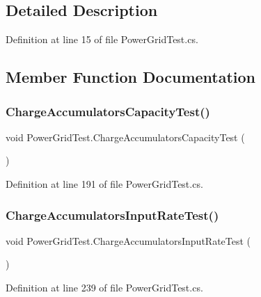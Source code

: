 \subsection{Detailed Description}


Definition at line 15 of file Power\+Grid\+Test.\+cs.



\subsection{Member Function Documentation}
\mbox{\label{class_power_grid_test_a5664e36caefc2c71c830df6188c187e0}} 
\subsubsection{\texorpdfstring{Charge\+Accumulators\+Capacity\+Test()}{ChargeAccumulatorsCapacityTest()}}
{\footnotesize\ttfamily void Power\+Grid\+Test.\+Charge\+Accumulators\+Capacity\+Test (\begin{DoxyParamCaption}{ }\end{DoxyParamCaption})}



Definition at line 191 of file Power\+Grid\+Test.\+cs.

\mbox{\label{class_power_grid_test_a27e99c5afa00024d68312a965b74b625}} 
\subsubsection{\texorpdfstring{Charge\+Accumulators\+Input\+Rate\+Test()}{ChargeAccumulatorsInputRateTest()}}
{\footnotesize\ttfamily void Power\+Grid\+Test.\+Charge\+Accumulators\+Input\+Rate\+Test (\begin{DoxyParamCaption}{ }\end{DoxyParamCaption})}



Definition at line 239 of file Power\+Grid\+Test.\+cs.

